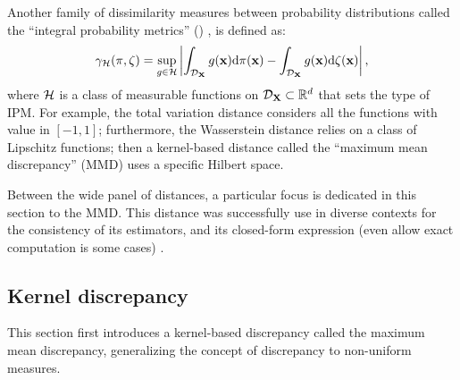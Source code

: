Another family of dissimilarity measures between probability distributions called the ``integral probability metrics'' () \citep{muller_1997_ipm}, is defined as: 
\begin{equation}
    \gamma_{\mathcal{H}}(\pi, \zeta) = \sup_{g \in \mathcal{H}} \left | \int_{\mathcal{D}_{{\bf X}}} g({\bf x}) \mathrm{d} \pi({\bf x}) - \int_{\mathcal{D}_{{\bf X}}} g({\bf x}) \mathrm{d} \zeta({\bf x}) \right|,
    \label{eq:ipm}  
\end{equation}
where $\mathcal{H}$ is a class of measurable functions on $\mathcal{D}_{{\bf X}} \subset \mathbb{R}^d$ that sets the type of IPM.   
For example, the total variation distance considers all the functions with value in $[-1, 1]$; 
furthermore, the Wasserstein distance relies on a class of Lipschitz functions; 
then a kernel-based distance called the ``maximum mean discrepancy'' (MMD) uses a specific Hilbert space. 

Between the wide panel of distances\footnotemark, a particular focus is dedicated in this section to the MMD. 
This distance was successfully use in diverse contexts for the consistency of its estimators, and its closed-form expression (even allow exact computation is some cases) \citep{sriperumbudur_2012}. 




\subsection*{Kernel discrepancy}

This section first introduces a kernel-based discrepancy called the maximum mean discrepancy, generalizing the concept of discrepancy to non-uniform measures.

